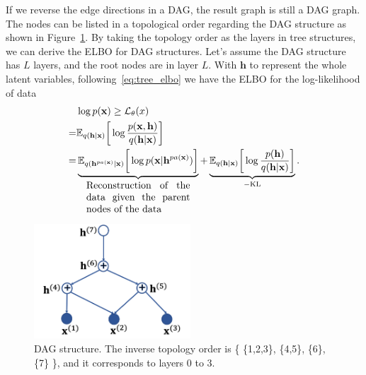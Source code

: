 \documentclass[conference]{IEEEtran}
\begin{document}
If we reverse the edge directions in a DAG, the  result graph is still a DAG graph.  The nodes can be listed in a topological order regarding the DAG structure as shown in Figure~\ref{fig:dag}. By taking the topology order as the layers in tree structures, we can derive the ELBO for DAG structures.  Let's assume the DAG structure has $L$ layers, and the root nodes are in layer $L$. With $\mathbf{h}$ to represent the whole latent variables, following~\eqref{eq:tree_elbo} we have the ELBO for the log-likelihood of  data 
\begin{align}  \label{eq:dag_elbo}
&\log p(\mathbf{x})  \geq  \mathcal{L}_{\theta}(x)  \\ \notag
 =&  \mathbb{E}_{q(\mathbf{h} | \mathbf{x})} \bigg[ \log  \frac{p(\mathbf{x}, \mathbf{h})}{q(\mathbf{h}|\mathbf{x})}  \bigg]  \\ \notag
=&  \underbrace{ \mathbb{E}_{q(\mathbf{h}^{pa(\mathbf{x})} | \mathbf{x})} \bigg[ \log  p(\mathbf{x} | \mathbf{h}^{pa(\mathbf{x})})  \bigg] }_{  \parbox{10.5em}{Reconstruction of the data given the parent nodes of the data}}  +  \underbrace{  \mathbb{E}_{q(\mathbf{h}| \mathbf{x})} \bigg[ \log  \frac{p( \mathbf{h})}{q(\mathbf{h}|\mathbf{x})}  \bigg] }_{-\text{KL}}.   \notag
\end{align}

\begin{figure}[!htbp]
    \centering
    \includegraphics[width=2.3in]{fig/dag.png}
    \caption{DAG structure. The inverse topology order is \big\{ \{1,2,3\}, \{4,5\}, \{6\},  \{7\} \big\}, and it corresponds to layers 0 to 3.  }
    \label{fig:dag}
\end{figure}
\end{document}
